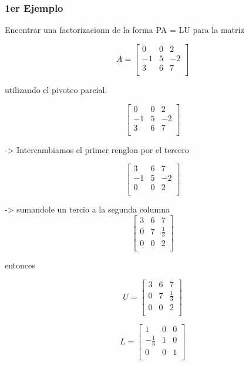 \documentclass{article}
\begin{document}
\subsubsection{1er Ejemplo}
Encontrar una factorizacionn de la forma PA = LU para la matriz


\[
    A=
    \begin{bmatrix}
        0 & 0  & 2   \\
        -1 & 5  & -2   \\
        3 & 6  & 7   \\
    \end{bmatrix}
\]

utilizando el pivoteo parcial.

\[
    \begin{bmatrix}
        0 & 0  & 2   \\
        -1 & 5  & -2   \\
        3 & 6  & 7   \\
    \end{bmatrix}
\]

-> Intercambiamos el primer renglon por el tercero

\[
\begin{bmatrix}
        3 & 6 & 7   \\
        -1 & 5  & -2   \\
        0 & 0  & 2   \\
    \end{bmatrix}
\]

-> sumandole un tercio a la segunda columna
\[
\begin{bmatrix}
        3 & 6 & 7   \\
        0 & 7  & \frac{1}{3}   \\
        0 & 0  & 2   \\
    \end{bmatrix}
\]

entonces

\[
    U=
    \begin{bmatrix}
        3 & 6  & 7   \\
       0 & 7  & \frac{1}{3}   \\
        0 & 0  & 2   \\
    \end{bmatrix}
\]

\[
    L=
    \begin{bmatrix}
        1 & 0  & 0   \\
        -\frac{1}{3} & 1  & 0   \\
        0 & 0  & 1   \\
    \end{bmatrix}
\]
\end{document}
